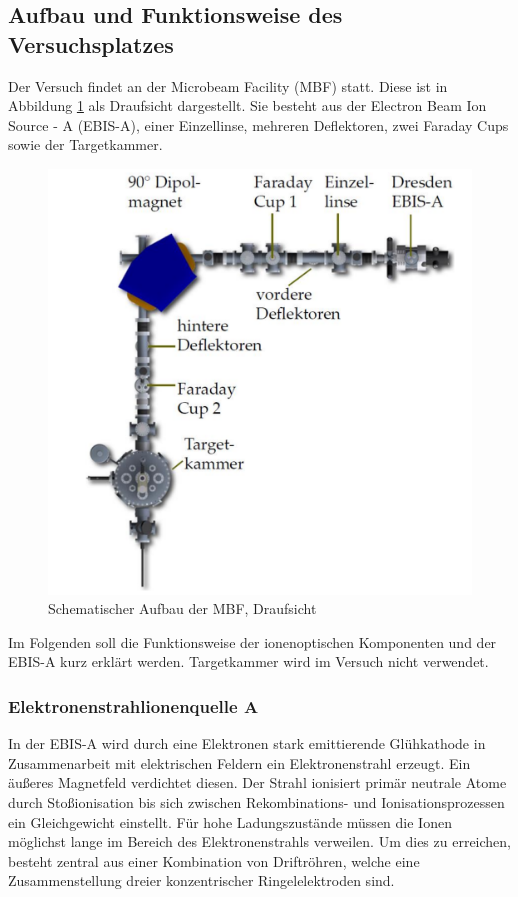     \subsection{Aufbau und Funktionsweise des Versuchsplatzes}
        Der Versuch findet an der Microbeam Facility (MBF) statt. Diese ist in Abbildung \ref{aufb} als Draufsicht dargestellt. Sie besteht aus der Electron Beam Ion Source - A (EBIS-A), einer Einzellinse, mehreren Deflektoren, zwei Faraday Cups sowie der Targetkammer. 
        \begin{figure}[htbp]
            \includegraphics[scale=.8]{pic/aufbau.png}
            \caption{Schematischer Aufbau der MBF, Draufsicht \cite{PA}}
            \label{aufb}
        \end{figure}
        Im Folgenden soll die Funktionsweise der ionenoptischen Komponenten und der EBIS-A kurz erklärt werden.
        Targetkammer wird im Versuch nicht verwendet.
        \subsubsection{Elektronenstrahlionenquelle A}
            In der EBIS-A wird durch eine Elektronen stark emittierende Glühkathode in Zusammenarbeit mit elektrischen Feldern ein Elektronenstrahl erzeugt. Ein äußeres Magnetfeld verdichtet diesen. Der Strahl ionisiert primär neutrale Atome durch Stoßionisation bis sich zwischen Rekombinations- und Ionisationsprozessen ein Gleichgewicht einstellt. Für hohe Ladungszustände müssen die Ionen möglichst lange im Bereich des Elektronenstrahls verweilen. Um dies zu erreichen, besteht zentral aus einer Kombination von Driftröhren, welche eine Zusammenstellung dreier konzentrischer Ringelelektroden sind. 
